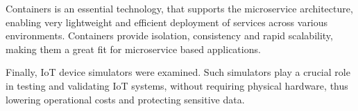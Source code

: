 Containers is an essential technology, that supports the microservice architecture, enabling very lightweight and efficient deployment of services across various environments. Containers provide isolation, consistency and rapid scalability, making them a great fit for microservice based applications.

Finally, IoT device simulators were examined. Such simulators play a crucial role in testing and validating IoT systems, without requiring physical hardware, thus lowering operational costs and protecting sensitive data.